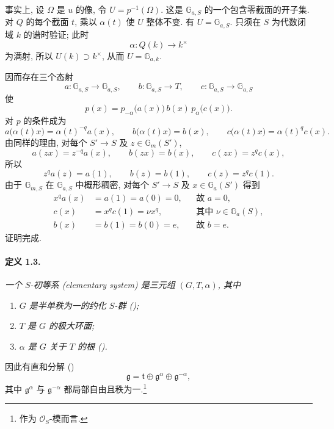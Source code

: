 事实上, 设 \(\Omega\) 是 \(u\) 的像, 令 \(U=p^{-1}(\Omega)\). 这是 \(\mathbb G_{a,S}\) 的一个包含零截面的开子集. 对 \(Q\) 的每个截面 \(t\), 乘以 \(\alpha(t)\) 使 \(U\) 整体不变. 有 \(U=\mathbb G_{a,S}\). 只须在 \(S\) 为代数闭域 \(k\) 的谱时验证; 此时
\[
  \alpha\colon Q(k)\longrightarrow k^\times
\]
为满射, 所以 \(U(k)\supset k^\times\), 从而 \(U=\mathbb G_{a,k}\).

因而存在三个态射
\[
  a\colon\mathbb G_{a,S}\longrightarrow\mathbb G_{a,S},
  \qquad
  b\colon\mathbb G_{a,S}\longrightarrow T,
  \qquad
  c\colon\mathbb G_{a,S}\longrightarrow\mathbb G_{a,S}
\]
使
\[
  p(x)=p_{-\alpha}\bigl(a(x)\bigr)\,b(x)\,
       p_\alpha\bigl(c(x)\bigr).
\]
对 \(p\) 的条件成为
\[
  a\bigl(\alpha(t)x\bigr)=\alpha(t)^{-q}a(x),\qquad
  b\bigl(\alpha(t)x\bigr)=b(x),\qquad
  c\bigl(\alpha(t)x\bigr)=\alpha(t)^q c(x).
\]
由同样的理由, 对每个 \(S'\to S\) 及 \(z\in\mathbb G_m(S')\),
\[
  a(zx)=z^{-q}a(x),\qquad b(zx)=b(x),\qquad c(zx)=z^q c(x),
\]
所以
\[
  z^q a(z)=a(1),\qquad b(z)=b(1),\qquad c(z)=z^q c(1).
\]
由于 \(\mathbb G_{m,S}\) 在 \(\mathbb G_{a,S}\) 中概形稠密, 对每个 \(S'\to S\) 及 \(x\in\mathbb G_a(S')\) 得到
\[
\begin{aligned}
  x^q a(x)&=a(1)=a(0)=0, &&\text{故 }a=0,\\
  c(x)&=x^q c(1)=\nu x^q,
    &&\text{其中 }\nu\in\mathbb G_a(S),\\
  b(x)&=b(1)=b(0)=e, &&\text{故 }b=e.
\end{aligned}
\]
证明完成.

\paragraph{\textbf{定义 1.3.}}
\emph{一个 \(S\)-初等系 (elementary system) 是三元组 \((G,T,\alpha)\), 其中}
\begin{enumerate}
\item[\textup{(i)}] \emph{\(G\) 是半单秩为一的约化 \(S\)-群 \textup{()};}
\item[\textup{(ii)}] \emph{\(T\) 是 \(G\) 的极大环面;}
\item[\textup{(iii)}] \emph{\(\alpha\) 是 \(G\) 关于 \(T\) 的根 \textup{()}.}
\end{enumerate}
因此有直和分解 \textup{()}
\[
  \mathfrak g=\mathfrak t\oplus\mathfrak g^\alpha
  \oplus\mathfrak g^{-\alpha},
\]
其中 \(\mathfrak g^\alpha\) 与 \(\mathfrak g^{-\alpha}\) 都局部自由且秩为一.\footnote{作为 \(\mathcal O_S\)-模而言.}

